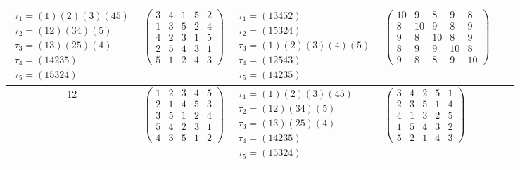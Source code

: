 \begin{longtable}{|c|p{2.7cm}|p{2.7cm}|p{2.7cm}|p{2.7cm}|p{3.3cm}|}
    $\begin{array}{l}\tau_{1}=(1)(2)(3)(45)\\ \tau_{2}=(12)(34)(5)\\ \tau_{3}=(13)(25)(4)\\ \tau_{4}=(14235)\\ \tau_{5}=(15324)\end{array}$     &
    $\begin{pmatrix}3&4&1&5&2\\1&3&5&2&4\\4&2&3&1&5\\2&5&4&3&1\\5&1&2&4&3\end{pmatrix}$                                                         &
    $\begin{array}{l}\tau_{1}=(13452)\\ \tau_{2}=(15324)\\ \tau_{3}=(1)(2)(3)(4)(5)\\ \tau_{4}=(12543)\\ \tau_{5}=(14235)\end{array}$           &
    $\begin{pmatrix}10&9&8&9&8\\8&10&9&8&9\\9&8&10&8&9\\8&9&9&10&8\\9&8&8&9&10\end{pmatrix}$                                                                                                                                \\
    \hline
    12                                                                                                                                          &
    $\begin{pmatrix}1&2&3&4&5\\2&1&4&5&3\\3&5&1&2&4\\5&4&2&3&1\\4&3&5&1&2\end{pmatrix}$                                                         &
    $\begin{array}{l}\tau_{1}=(1)(2)(3)(45)\\ \tau_{2}=(12)(34)(5)\\ \tau_{3}=(13)(25)(4)\\ \tau_{4}=(14235)\\ \tau_{5}=(15324)\end{array}$     &
    $\begin{pmatrix}3&4&2&5&1\\2&3&5&1&4\\4&1&3&2&5\\1&5&4&3&2\\5&2&1&4&3\end{pmatrix}$                                                         &

\end{longtable}
